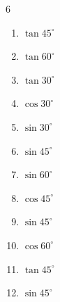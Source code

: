 \begin{multicols}{6}
\begin{enumerate}

  \item $\displaystyle \tan{45^\circ}$

        \phantom{$\displaystyle =1$}

  \item $\displaystyle \tan{60^\circ}$


  \item $\displaystyle \tan{30^\circ}$


  \item $\displaystyle \cos{30^\circ}$


  \item $\displaystyle \sin{30^\circ}$


  \item $\displaystyle \sin{45^\circ}$


  \item $\displaystyle \sin{60^\circ}$


  \item $\displaystyle \cos{45^\circ}$


  \item $\displaystyle \sin{45^\circ}$


  \item $\displaystyle \cos{60^\circ}$


  \item $\displaystyle \tan{45^\circ}$

        \phantom{$\displaystyle =1$}

\columnbreak %

  \item $\displaystyle \sin{45^\circ}$



\end{enumerate}
\end{multicols}

